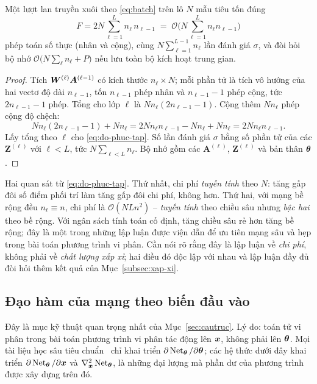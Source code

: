 \begin{menhde}
\label{md:chi-phi}
Một lượt lan truyền xuôi theo \eqref{eq:batch} trên lô $N$ mẫu tiêu tốn đúng
\begin{equation}
F = 2N\sum_{\ell=1}^{L} n_\ell\, n_{\ell-1}
\;=\; \mathcal{O}\!\Big( N \sum_{\ell=1}^{L} n_\ell n_{\ell-1} \Big)
\label{eq:do-phuc-tap}
\end{equation}
phép toán số thực (nhân và cộng), cùng $N\sum_{\ell=1}^{L-1} n_\ell$ lần đánh
giá $\sigma$, và đòi hỏi bộ nhớ $\mathcal{O}\big(N\sum_{\ell} n_\ell + P\big)$
nếu lưu toàn bộ kích hoạt trung gian.
\end{menhde}
 
\begin{proof}
Tích $\bm{W}^{(\ell)}\bm{A}^{(\ell-1)}$ có kích thước $n_\ell \times N$; mỗi phần
tử là tích vô hướng của hai vectơ độ dài $n_{\ell-1}$, tốn $n_{\ell-1}$ phép
nhân và $n_{\ell-1}-1$ phép cộng, tức $2n_{\ell-1}-1$ phép. Tổng cho lớp $\ell$
là $N n_\ell (2 n_{\ell-1}-1)$. Cộng thêm $N n_\ell$ phép cộng độ chệch:
\[
N n_\ell (2 n_{\ell-1}-1) + N n_\ell
 = 2N n_\ell n_{\ell-1} - N n_\ell + N n_\ell
 = 2N n_\ell n_{\ell-1}.
\]
Lấy tổng theo $\ell$ cho \eqref{eq:do-phuc-tap}. Số lần đánh giá $\sigma$ bằng
số phần tử của các $\bm{Z}^{(\ell)}$ với $\ell < L$, tức
$N\sum_{\ell<L} n_\ell$. Bộ nhớ gồm các $\bm{A}^{(\ell)}$, $\bm{Z}^{(\ell)}$ và
bản thân $\bm{\theta}$.
\end{proof}
 
Hai quan sát từ \eqref{eq:do-phuc-tap}. Thứ nhất, chi phí \emph{tuyến tính} theo
$N$: tăng gấp đôi số điểm phối trí làm tăng gấp đôi chi phí, không hơn. Thứ hai,
với mạng bề rộng đều $n_\ell \equiv n$, chi phí là
$\mathcal{O}(N L n^2)$ -- \emph{tuyến tính} theo chiều sâu nhưng \emph{bậc hai}
theo bề rộng. Với ngân sách tính toán cố định, tăng chiều sâu rẻ hơn tăng bề
rộng; đây là một trong những lập luận được viện dẫn để ưu tiên mạng sâu và hẹp
trong bài toán phương trình vi phân. Cần nói rõ rằng đây là lập luận về
\emph{chi phí}, không phải về \emph{chất lượng xấp xỉ}; hai điều đó độc lập với
nhau và lập luận đầy đủ đòi hỏi thêm kết quả của Mục~\ref{subsec:xap-xi}.
 
\subsection{Đạo hàm của mạng theo biến đầu vào}
\label{subsec:dao-ham-dau-vao}
 
Đây là mục kỹ thuật quan trọng nhất của Mục~\ref{sec:cautruc}. Lý do: toán tử vi
phân trong bài toán phương trình vi phân tác động lên $\bm{x}$, không phải lên
$\bm{\theta}$. Mọi tài liệu học sâu tiêu chuẩn~\cite{goodfellow2016} chỉ khai triển
$\partial \operatorname{Net}_{\bm{\theta}}/\partial\bm{\theta}$; các hệ thức dưới đây khai triển
$\partial \operatorname{Net}_{\bm{\theta}}/\partial\bm{x}$ và $\nabla^2_{\bm{x}}\operatorname{Net}_{\bm{\theta}}$, là
những đại lượng mà phần dư của phương trình được xây dựng trên đó.
 
